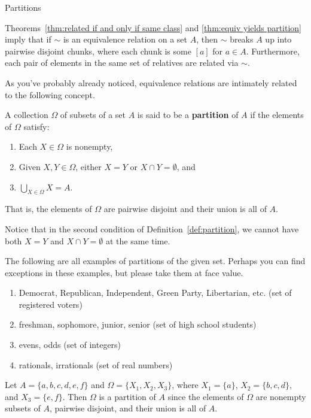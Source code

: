 \begin{section}{Partitions}

Theorems~\ref{thm:related if and only if same class} and \ref{thm:equiv yields partition} imply that if $\sim$ is an equivalence relation on a set $A$, then $\sim$ breaks $A$ up into pairwise disjoint chunks, where each chunk is some $[a]$ for $a\in A$. Furthermore, each  pair of elements in the same set of relatives are related via $\sim$.

As you've probably already noticed, equivalence relations are intimately related to the following concept.

\begin{definition}\label{def:partition}
A collection $\Omega$ of subsets of a set $A$ is said to be a \textbf{partition} of $A$ if the elements of $\Omega$ satisfy:
\begin{enumerate}[label=\textrm{(\alph*)}]
\item Each $X\in \Omega$ is nonempty,
\item Given $X,Y\in\Omega$, either $X=Y$ or $X\cap Y=\emptyset$, and
\item $\displaystyle \bigcup_{X\in\Omega}X=A$.
\end{enumerate}
That is, the elements of $\Omega$ are pairwise disjoint and their union is all of $A$.
\end{definition}

Notice that in the second condition of Definition~\ref{def:partition}, we cannot have both $X=Y$ and $X\cap Y=\emptyset$ at the same time.

\begin{example}
The following are all examples of partitions of the given set.  Perhaps you can find exceptions in these examples, but please take them at face value.
\begin{enumerate}[label=\textrm{(\alph*)}]
\item Democrat, Republican, Independent, Green Party, Libertarian, etc. (set of registered voters)
\item freshman, sophomore, junior, senior (set of high school students)
\item evens, odds (set of integers)
\item rationals, irrationals (set of real numbers)
\end{enumerate}
\end{example}

\begin{example}\label{ex:a partition}
Let $A=\{a,b,c,d,e,f\}$ and $\Omega=\{X_{1},X_{2},X_{3}\}$, where $X_{1}=\{a\}$, $X_{2}=\{b,c,d\}$, and $X_{3}=\{e,f\}$.  Then $\Omega$ is a partition of $A$ since the elements of $\Omega$ are nonempty subsets of $A$, pairwise disjoint, and their union is all of $A$.
\end{example}


\end{section}
